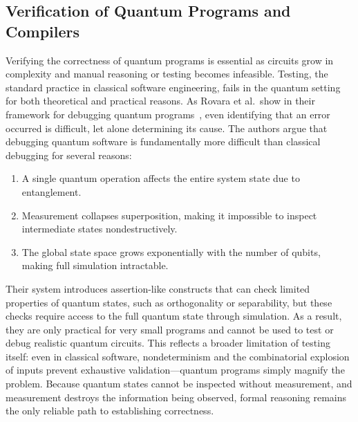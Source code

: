 \subsection{Verification of Quantum Programs and Compilers}
\label{sec:verification}

Verifying the correctness of quantum programs is essential as circuits grow in complexity and manual reasoning or testing becomes infeasible. 
Testing, the standard practice in classical software engineering, fails in the quantum setting for both theoretical and practical reasons. 
As Rovara et al.\ show in their framework for debugging quantum programs~\cite{rovara2025framework}, even identifying that an error occurred is difficult, let alone determining its cause. 
The authors argue that debugging quantum software is fundamentally more difficult than classical debugging for several reasons:

\begin{enumerate}
  \item A single quantum operation affects the entire system state due to entanglement.
  \item Measurement collapses superposition, making it impossible to inspect intermediate states nondestructively.
  \item The global state space grows exponentially with the number of qubits, making full simulation intractable.
\end{enumerate}

Their system introduces assertion-like constructs that can check limited properties of quantum states, such as orthogonality or separability, but these checks require access to the full quantum state through simulation. As a result, they are only practical for very small programs and cannot be used to test or debug realistic quantum circuits. This reflects a broader limitation of testing itself: even in classical software, nondeterminism and the combinatorial explosion of inputs prevent exhaustive validation—quantum programs simply magnify the problem. Because quantum states cannot be inspected without measurement, and measurement destroys the information being observed, formal reasoning remains the only reliable path to establishing correctness.


\vspace{1em}

